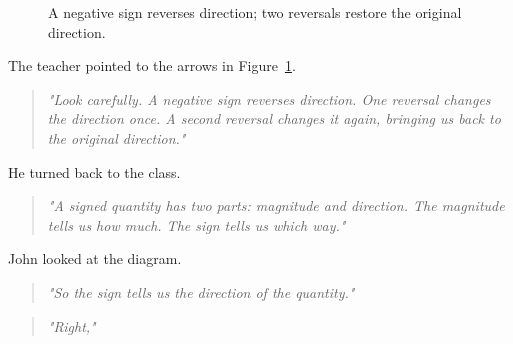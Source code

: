 \documentclass[11pt]{article}
\begin{document}
\begin{figure}[ht]
\centering


\caption{A negative sign reverses direction; two reversals restore the original direction.}

\label{fig:directionreversal}

\end{figure}


The teacher pointed to the arrows in Figure~\ref{fig:directionreversal}.

\begin{quote}
\emph{"Look carefully. A negative sign reverses direction. One reversal changes the direction once. A second reversal changes it again, bringing us back to the original direction."}
\end{quote}

He turned back to the class.

\begin{quote}
\emph{"A signed quantity has two parts: magnitude and direction. The magnitude tells us how much. The sign tells us which way."}
\end{quote}

John looked at the diagram.

\begin{quote}
\emph{"So the sign tells us the direction of the quantity."}
\end{quote}

\begin{quote}
\emph{"Right,"}
\end{quote}
\end{document}
